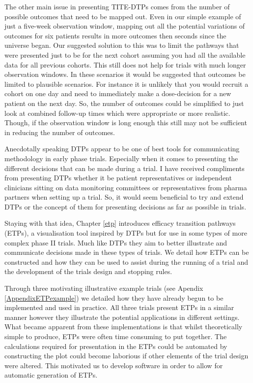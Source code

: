 The other main issue in presenting TITE-DTPs comes from the number of possible outcomes that need to be mapped out. Even in our simple example of just a five-week observation window, mapping out all the potential variations of outcomes for six patients results in more outcomes then seconds since the universe began.  Our suggested solution to this was to limit the pathways that were presented just to be for the next cohort assuming you had all the available data for all previous cohorts. This still does not help for trials with much longer observation windows. In these scenarios it would be suggested that outcomes be limited to plausible scenarios. For instance it is unlikely that you would recruit a cohort on one day and need to immediately make a dose-decision for a new patient on the next day. So, the number of outcomes could be simplified to just look at combined follow-up times which were appropriate or more realistic. Though, if the observation window is long enough this still may not be sufficient in reducing the number of outcomes. 

Anecdotally speaking DTPs appear to be one of best tools for communicating methodology in early phase trials. Especially when it comes to presenting the different decisions that can be made during a trial. I have received compliments from presenting DTPs whether it be patient representatives or independent clinicians sitting on data monitoring committees or representatives from pharma partners when setting up a trial. So, it would seem beneficial to try and extend DTPs or the concept of them for presenting decisions as far as possible in trials.  

Staying with that idea, Chapter \ref{etp} introduces efficacy transition pathways (ETPs), a visualisation tool inspired by DTPs but for use in some types of more complex phase \RN{2} trials. Much like DTPs they aim to better illustrate and communicate decisions made in these types of trials. We detail how ETPs can be constructed and how they can be used to assist during the running of a trial and the development of the trials design and stopping rules. 

Through three motivating illustrative example trials (see Apendix \ref{AppendixETPexample}) we detailed how they have already begun to be implemented and used in practice. All three trials present ETPs in a similar manner however they illustrate the potential applications in different settings. What became apparent from these implementations is that whilst theoretically simple to produce, ETPs were often time consuming to put together. The calculations required for presentation in the ETPs could be automated by constructing the plot could become laborious if other elements of the trial design were altered. This motivated us to develop software in order to allow for automatic generation of ETPs.      

